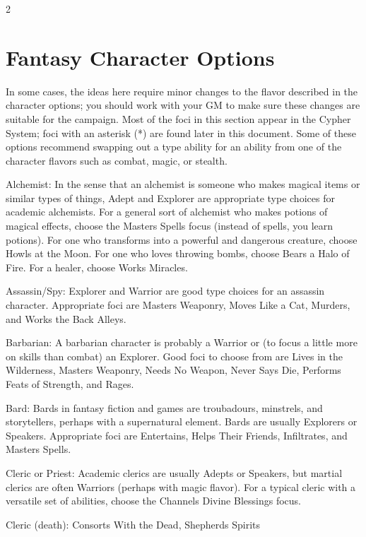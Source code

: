 
\begin{multicols}{2}

\chapter{Fantasy Character Options}

In some cases, the ideas here require minor changes to the flavor described in the character options; you should work with your GM to make sure these changes are suitable for the campaign. Most of the foci in this section appear in the Cypher System; foci with an asterisk (*) are found later in this document. Some of these options recommend swapping out a type ability for an ability from one of the character flavors such as combat, magic, or stealth. 

Alchemist: In the sense that an alchemist is someone who makes magical items or similar types of things, Adept and Explorer are appropriate type choices for academic alchemists. For a general sort of alchemist who makes potions of magical effects, choose the Masters Spells focus (instead of spells, you learn potions). For one who transforms into a powerful and dangerous creature, choose Howls at the Moon. For one who loves throwing bombs, choose Bears a Halo of Fire. For a healer, choose Works Miracles.

Assassin/Spy: Explorer and Warrior are good type choices for an assassin character. Appropriate foci are Masters Weaponry, Moves Like a Cat, Murders, and Works the Back Alleys. 

Barbarian: A barbarian character is probably a Warrior or (to focus a little more on skills than combat) an Explorer. Good foci to choose from are Lives in the Wilderness, Masters Weaponry, Needs No Weapon, Never Says Die, Performs Feats of Strength, and Rages. 

Bard: Bards in fantasy fiction and games are troubadours, minstrels, and storytellers, perhaps with a supernatural element. Bards are usually Explorers or 
Speakers. Appropriate foci are Entertains, Helps Their Friends, Infiltrates, and Masters Spells. 

Cleric or Priest: Academic clerics are usually Adepts or Speakers, but martial clerics are often Warriors (perhaps with magic flavor). For a typical cleric with a versatile set of abilities, choose the Channels Divine Blessings focus. 

Cleric (death): Consorts With the Dead, Shepherds Spirits 


\end{multicols}
